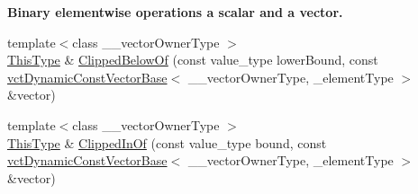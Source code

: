 \begin{Indent}{\bf Binary elementwise operations a scalar and a vector.}
\begin{DoxyCompactItemize}
\item 
{\footnotesize template$<$class \+\_\+\+\_\+vector\+Owner\+Type $>$ }\\\hyperlink{classvct_dynamic_const_vector_base_a39da273523717f678f54d3321ebca3dd}{This\+Type} \& \hyperlink{classvct_dynamic_vector_base_a05e54537bddcec043c39976525b0bcd7}{Clipped\+Below\+Of} (const value\+\_\+type lower\+Bound, const \hyperlink{classvct_dynamic_const_vector_base}{vct\+Dynamic\+Const\+Vector\+Base}$<$ \+\_\+\+\_\+vector\+Owner\+Type, \+\_\+element\+Type $>$ \&vector)
\item 
{\footnotesize template$<$class \+\_\+\+\_\+vector\+Owner\+Type $>$ }\\\hyperlink{classvct_dynamic_const_vector_base_a39da273523717f678f54d3321ebca3dd}{This\+Type} \& \hyperlink{classvct_dynamic_vector_base_a26861762ef763c10ffcd9bc02530d291}{Clipped\+In\+Of} (const value\+\_\+type bound, const \hyperlink{classvct_dynamic_const_vector_base}{vct\+Dynamic\+Const\+Vector\+Base}$<$ \+\_\+\+\_\+vector\+Owner\+Type, \+\_\+element\+Type $>$ \&vector)
\end{DoxyCompactItemize}
\end{Indent}
